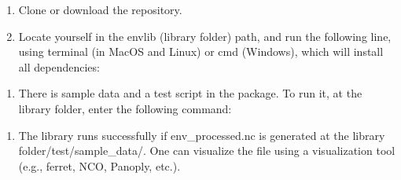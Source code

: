 \documentclass[a4paper,11pt,english]{sphinxmanual}
\begin{document}
\begin{sphinxVerbatim}[commandchars=\\\{\}]
    
  
\end{sphinxVerbatim}
\begin{enumerate}
%
\item {} 
Clone or download the repository.

\item {} 
Locate yourself in the envlib (library folder) path, and run the following line, using terminal (in MacOS and Linux) or cmd (Windows), which will install all dependencies:

\end{enumerate}

\begin{sphinxVerbatim}[commandchars=\\\{\}]
  
\end{sphinxVerbatim}
\begin{enumerate}
%
\setcounter{enumi}{2}
\item {} 
There is sample data and a test script in the package. To run it, at the library folder, enter the following command:

\end{enumerate}

\begin{sphinxVerbatim}[commandchars=\\\{\}]
  
\end{sphinxVerbatim}
\begin{enumerate}
%
\setcounter{enumi}{3}
\item {} 
The library runs successfully if env\_processed.nc is generated at the library folder/test/sample\_data/. One can visualize the file using a visualization tool (e.g., ferret, NCO, Panoply, etc.).

\end{enumerate}
\end{document}
